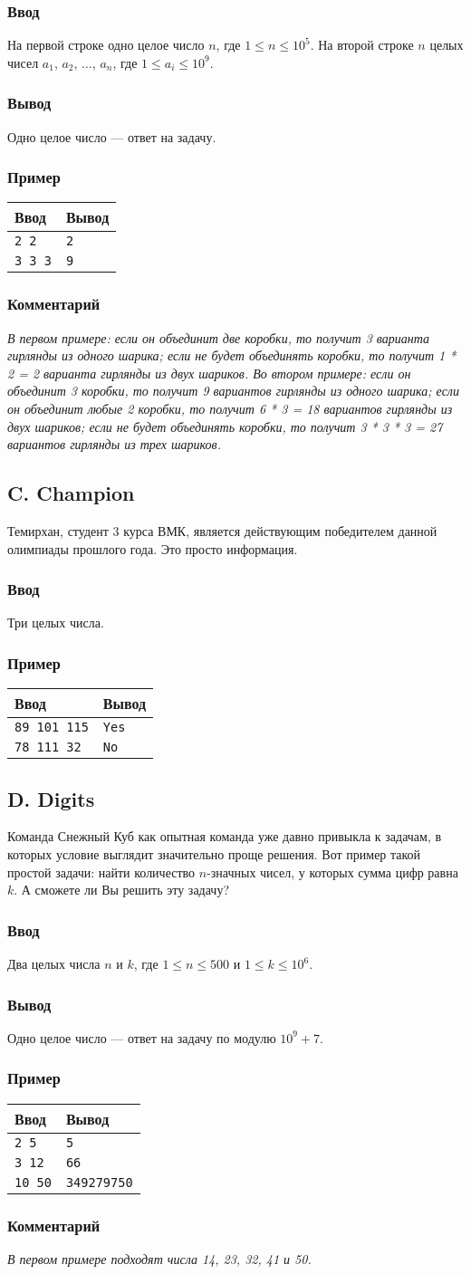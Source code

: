\documentclass[10pt, a4paper]{article}
\newcommand{\informat}[1]
{
	\subsubsection*{Ввод} #1
}
\newcommand{\outformat}[1]
{
	\subsubsection*{Вывод} #1
}
\newcommand{\examplee}[4]
{
	\subsubsection*{Пример}
	\noindent
	\begin{center}
	\begin{tabularx}{\linewidth}{|X|X|}
	\hline
	Ввод 	& Вывод  	\\
	\hline
	{\tt #1} & {\tt #2}	\\
	\hline
	{\tt #3} & {\tt #4}	\\
	\hline
	\end{tabularx}
	\end{center}
}
\newcommand{\exampleee}[6]
{
	\subsubsection*{Пример}
	\noindent
	\begin{center}
	\begin{tabularx}{\linewidth}{|X|X|}
	\hline
	Ввод 	& Вывод  	\\
	\hline
	{\tt #1} & {\tt #2}	\\
	\hline
	{\tt #3} & {\tt #4}	\\
	\hline
	{\tt #5} & {\tt #6}	\\
	\hline
	\end{tabularx}
	\end{center}
}
\newcommand{\excomm}[1]
{
	\subsubsection*{Комментарий}
	\textit{#1}
}
\begin{document}
\informat{На первой строке одно целое число $n$, где $1 \le n \le 10^{5}$. \newline
На второй строке $n$ целых чисел $a_1$, $a_2$, $\dots$, $a_n$, где $1 \le a_i \le 10^{9}$.}

\outformat{Одно целое число --- ответ на задачу.}

\examplee{2 \newline 1 2}{2}{3 \newline 3 3 3}{9}

\excomm{В первом примере: если он объединит две коробки, то получит 3 варианта гирлянды из одного шарика; если не будет объединять коробки, то получит 1 * 2 = 2 варианта гирлянды из двух шариков. \newline
Во втором примере: если он объединит 3 коробки, то получит 9 вариантов гирлянды из одного шарика; если он объединит любые 2 коробки, то получит 6 * 3 = 18 вариантов гирлянды из двух шариков; если не будет объединять коробки, то получит 3 * 3 * 3 = 27 вариантов гирлянды из трех шариков.}



\subsection*{C. Champion}

Темирхан, студент 3 курса ВМК, является действующим победителем данной олимпиады прошлого года. Это просто информация.

\informat{Три целых числа.}

\examplee{89 101 115}{Yes}{78 111 32}{No }



\subsection*{D. Digits}

Команда Снежный Куб как опытная команда уже давно привыкла к задачам, в которых условие выглядит значительно проще решения. Вот пример такой простой задачи: найти количество $n$-значных чисел, у которых сумма цифр равна $k$. А сможете ли Вы решить эту задачу?

\informat{Два целых числа $n$ и $k$, где $1 \le n \le 500$ и $1 \le k \le 10^6$.}

\outformat{Одно целое число --- ответ на задачу по модулю $10^9 + 7$.}

\exampleee{2 5}{5}{3 12}{66}{10 50}{349279750}

\excomm{В первом примере подходят числа 14, 23, 32, 41 и 50.}
\end{document}
